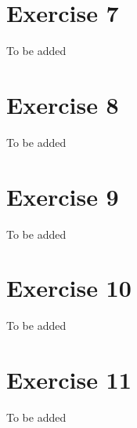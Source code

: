 \documentclass[11pt]{article} %
\begin{document}
\section*{Exercise 7}

To be added

\section*{Exercise 8}

To be added

\section*{Exercise 9}

To be added

\section*{Exercise 10}

To be added

\section*{Exercise 11}

To be added
\end{document}
